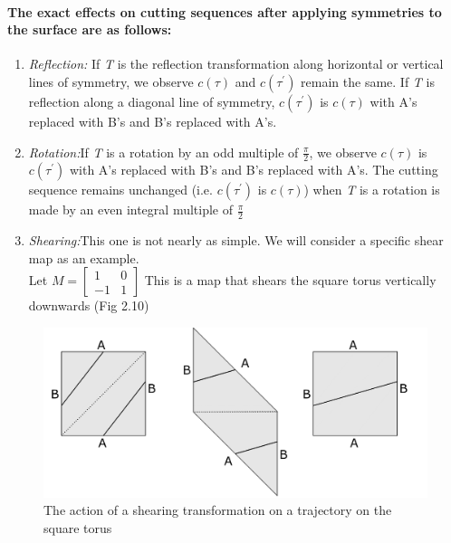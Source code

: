 \documentclass{report}
\begin{document}
\paragraph{The exact effects on cutting sequences after applying symmetries to the surface are as follows:}

\begin{enumerate}
\item  {\emph{Reflection:} If \textit{T} is the reflection transformation along horizontal or vertical lines of symmetry, we observe $c(\tau)$ and $c(\tau^{'})$ remain the same. If \textit{T} is reflection along a diagonal line of symmetry, $c(\tau^{'})$ is $c(\tau)$ with A’s replaced with B’s and B’s replaced with A’s.}
\item  {\emph{Rotation:}If \textit{T} is a rotation by an odd multiple of $\frac{\pi}{2}$, we observe $c(\tau)$ is $c(\tau^{'})$ with A’s replaced with B’s and B’s replaced with A’s. The cutting sequence remains unchanged (i.e. $c(\tau^{'})$ is $c(\tau)$) when \textit{T} is a rotation is made by an even integral multiple of $\frac{\pi}{2}$}
\item  {\emph{Shearing:}This one is not nearly as simple. We will consider a specific shear map as an example. \\
Let $M = \begin{bmatrix} 1&0\\-1&1 \end{bmatrix}$ This is a map that shears the square torus vertically downwards (Fig 2.10) }
\end{enumerate}

\begin{figure} 
\begin{center}
\includegraphics[scale=0.3]{2.10}
\caption{The action of a shearing transformation on a trajectory on the square torus}
\end{center}
\end{figure}
\end{document}
